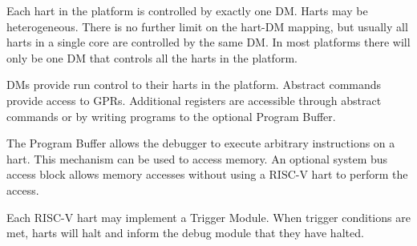 Each hart in the platform is controlled by exactly one DM. Harts may be
heterogeneous. There is no further limit on the hart-DM mapping, but usually
all harts in a single core are controlled by the same DM. In most platforms there
will only be one DM that controls all the harts in the platform.

DMs provide run control to their harts in the platform. Abstract commands
provide access to GPRs. Additional registers are accessible through abstract
commands or by writing programs to the optional Program Buffer.

The Program Buffer allows the debugger to execute arbitrary instructions on a
hart. This mechanism can be used to access memory.  An optional system bus
access block allows memory accesses without using a RISC-V hart to perform the
access.

Each RISC-V hart may implement a Trigger Module. When trigger conditions
are met, harts will halt and inform the debug module that they have
halted.
